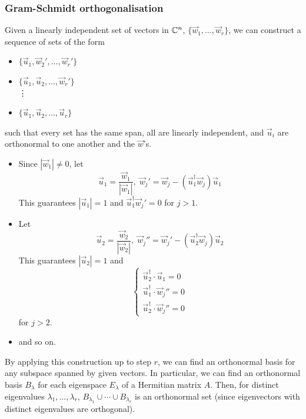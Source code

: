 \documentclass{../template/note}
\begin{document}
    \subsubsection{Gram-Schmidt orthogonalisation}

    Given a linearly independent set of vectors in \(\mathbb C^n\), \(\{\vec w_1, \dots, \vec w_r\}\), we can construct a sequence of sets of the form
    \begin{itemize}
        \item \(\{\vec u_1, \vec w_2', \dots, \vec w_r'\}\)
        \item \(\{\vec u_1, \vec u_2, \dots, \vec w_r'\}\) \\[5pt]
        \vdots
        \item \(\{\vec u_1, \vec u_2, \dots, \vec u_r\}\)
    \end{itemize}
    such that every set has the same span, all are linearly independent, and \(\vec u_i\) are orthonormal to one another and the \(\vec w\)'s.
    
    \begin{algorithm}
        \begin{itemize}
            \item Since \(|\vec w_1| \neq 0\), let
            \[
                \vec u_1 = \frac{\vec w_1}{|\vec w_1|}, \; \vec w_j' = \vec w_j - (\vec u_1^\dagger \vec w_j)\vec u_1
            \]
            This guarantees \(|\vec u_1| = 1\) and \(\vec u_1^\dagger \vec w_j' = 0\) for \(j > 1\).
            \item Let 
            \[
                \vec u_2 = \frac{\vec w_2}{|\vec w_2|}, \; \vec w_j'' = \vec w_j' - (\vec u_2^\dagger \vec w_j)\vec u_2
            \]
            This guarantees \(|\vec u_2| = 1\) and
            \[
                \begin{cases}
                    \vec u_2^\dagger \cdot \vec u_1 = 0 \\
                    \vec u_1^\dagger \cdot \vec w_j'' = 0 \\
                    \vec u_2^\dagger \cdot \vec w_j'' = 0
                \end{cases}
            \]
            for \(j > 2\).
            \item and so on.
        \end{itemize}
    \end{algorithm}
    
    By applying this construction up to step \(r\), we can find an orthonormal basis for any subspace spanned by given vectors. In particular, we can find an orthonormal basis \(B_\lambda\) for each eigenspace \(E_\lambda\) of a Hermitian matrix \(A\). Then, for distinct eigenvalues \(\lambda_1, \dots, \lambda_r\), \(B_{\lambda_1} \cup \cdots \cup B_{\lambda_r}\) is an orthonormal set (since eigenvectors with distinct eigenvalues are orthogonal).
\end{document}
